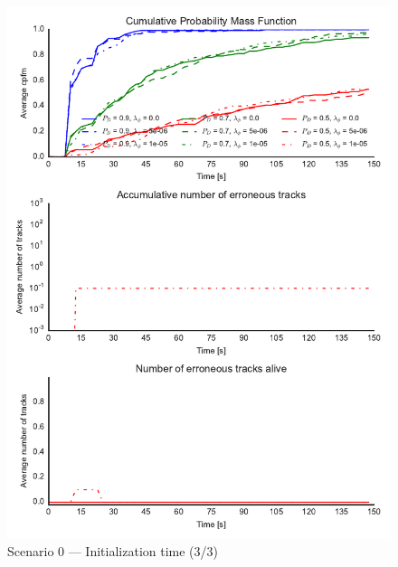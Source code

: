 \begin{figure}
\centering
\includegraphics{Figures/plots/Scenario0_Init-Time(3-3).pdf}
\caption{Scenario 0 --- Initialization time (3/3)}\label{fig:init0_time_3-3}
\end{figure}

